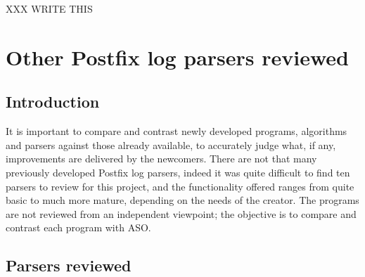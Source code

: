 \documentclass[a4paper,12pt,draft]{article}
\newcommand{\parsername}{ASO}
\begin{document}
\label{conclusion}

XXX WRITE THIS


\appendix


\section{Other Postfix log parsers reviewed}

\label{other-parsers}

\subsection{Introduction}

It is important to compare and contrast newly developed programs,
algorithms and parsers against those already available, to accurately judge
what, if any, improvements are delivered by the newcomers.  There are not
that many previously developed Postfix log parsers, indeed it was quite
difficult to find ten parsers to review for this project, and the
functionality offered ranges from quite basic to much more mature,
depending on the needs of the creator.  The programs are not reviewed from
an independent viewpoint; the objective is to compare and contrast each
program with \parsername{}.

\subsection{Parsers reviewed}
\end{document}
